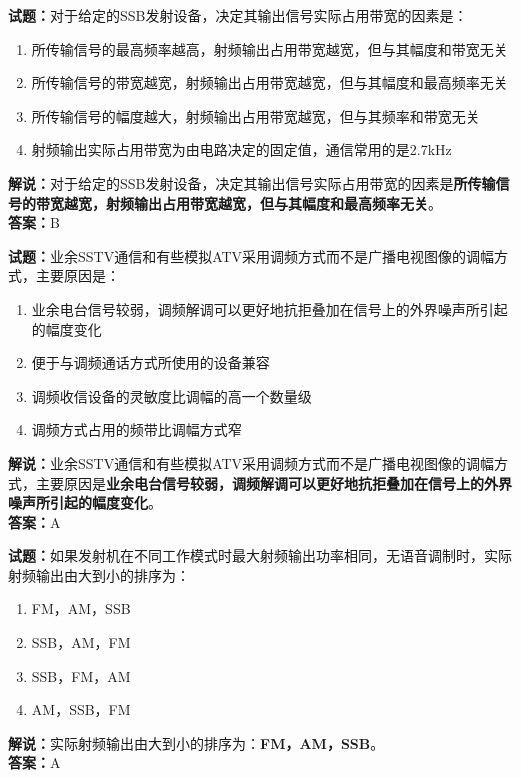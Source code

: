 \documentclass{ctexbook}
\begin{document}
\bigskip


\noindent\textbf{试题：}对于给定的SSB发射设备，决定其输出信号实际占用带宽的因素是：
\begin{enumerate}[leftmargin=3em]
\item 所传输信号的最高频率越高，射频输出占用带宽越宽，但与其幅度和带宽无关
\item 所传输信号的带宽越宽，射频输出占用带宽越宽，但与其幅度和最高频率无关
\item 所传输信号的幅度越大，射频输出占用带宽越宽，但与其频率和带宽无关
\item 射频输出实际占用带宽为由电路决定的固定值，通信常用的是2.7kHz
\end{enumerate}
\noindent\textbf{解说：}对于给定的SSB发射设备，决定其输出信号实际占用带宽的因素是\textbf{所传输信号的带宽越宽，射频输出占用带宽越宽，但与其幅度和最高频率无关}。\\\noindent\textbf{答案：}B




\bigskip


\noindent\textbf{试题：}业余SSTV通信和有些模拟ATV采用调频方式而不是广播电视图像的调幅方式，主要原因是： 
\begin{enumerate}[leftmargin=3em]
\item 业余电台信号较弱，调频解调可以更好地抗拒叠加在信号上的外界噪声所引起的幅度变化
\item 便于与调频通话方式所使用的设备兼容
\item 调频收信设备的灵敏度比调幅的高一个数量级
\item 调频方式占用的频带比调幅方式窄
\end{enumerate}
\noindent\textbf{解说：}业余SSTV通信和有些模拟ATV采用调频方式而不是广播电视图像的调幅方式，主要原因是\textbf{业余电台信号较弱，调频解调可以更好地抗拒叠加在信号上的外界噪声所引起的幅度变化}。\\\noindent\textbf{答案：}A




\bigskip


\noindent\textbf{试题：}如果发射机在不同工作模式时最大射频输出功率相同，无语音调制时，实际射频输出由大到小的排序为：
\begin{enumerate}[leftmargin=3em]
\item FM，AM，SSB
\item SSB，AM，FM
\item SSB，FM，AM
\item AM，SSB，FM
\end{enumerate}
\noindent\textbf{解说：}实际射频输出由大到小的排序为：\textbf{FM，AM，SSB}。\\\noindent\textbf{答案：}A
\end{document}
